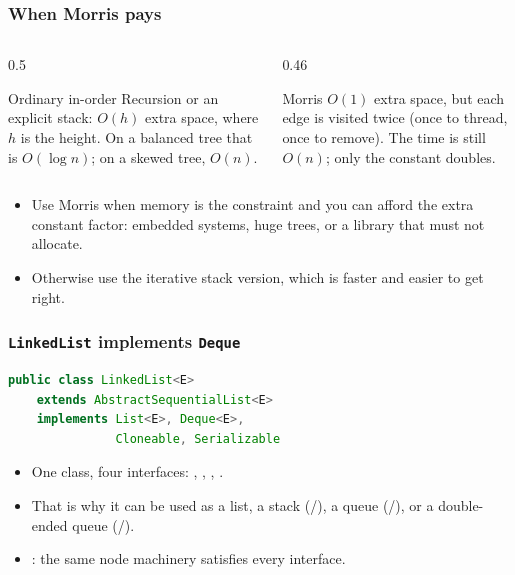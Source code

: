 \documentclass[aspectratio=169,10pt,compress]{beamer}
\begin{document}
\begin{frame}[t,fragile] \frametitle{When Morris pays}
  \begin{columns}[T]
    \begin{column}{0.5\textwidth}
      \begin{block}{Ordinary in-order}
        \small
        Recursion or an explicit stack: $O(h)$ extra space, where $h$
        is the height. On a balanced tree that is $O(\log n)$; on a
        skewed tree, $O(n)$.
      \end{block}
    \end{column}
    \begin{column}{0.46\textwidth}
      \begin{block}{Morris}
        \small
        $O(1)$ extra space, but each edge is visited twice
        (once to thread, once to remove). The time is still $O(n)$;
        only the constant doubles.
      \end{block}
    \end{column}
  \end{columns}
  \vspace{0.4em}
  \begin{itemize}\small
    \item Use Morris when memory is the constraint and you can afford
          the extra constant factor: embedded systems, huge trees,
          or a library that must not allocate.
    \item Otherwise use the iterative stack version, which is faster
          and easier to get right.
  \end{itemize}
\end{frame}





\begin{frame}[t,fragile] \frametitle{\texttt{LinkedList} implements \texttt{Deque}}
\begin{lstlisting}[language=Java, basicstyle=\ttfamily\small, frame=single, xleftmargin=2em]
public class LinkedList<E>
    extends AbstractSequentialList<E>
    implements List<E>, Deque<E>,
               Cloneable, Serializable
\end{lstlisting}
  \begin{itemize}\small
    \item One class, four interfaces: , ,
          , .
    \item That is why it can be used as a list, a stack
          (/), a queue (/),
          or a double-ended queue (/).
    \item {}: the same node machinery
          satisfies every interface.
  \end{itemize}
\end{frame}
\end{document}
